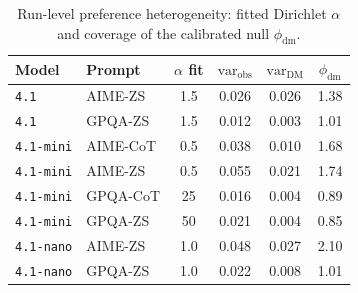 \documentclass[a4paper,fleqn]{cas-sc}
\begin{document}
\begin{table}[t]\begin{minipage}{\linewidth}
\centering
\caption{Run-level preference heterogeneity: fitted Dirichlet $\alpha$ and coverage of the calibrated null $\phi_{\mathrm{dm}}$.}
\label{tab:dispersion}
\begin{tabular}{llcccc}
\toprule
Model & Prompt & $\alpha$ fit & $\mathrm{var}_{\mathrm{obs}}$ &
$\mathrm{var}_{\mathrm{DM}}$ & $\phi_{\mathrm{dm}}$ \\
\midrule
\texttt{4.1} & AIME-ZS & 1.5 & 0.026 & 0.026 & 1.38 \\
\texttt{4.1} & GPQA-ZS & 1.5 & 0.012 & 0.003 & 1.01 \\
\texttt{4.1-mini} & AIME-CoT & 0.5 & 0.038 & 0.010 & 1.68 \\
\texttt{4.1-mini} & AIME-ZS & 0.5 & 0.055 & 0.021 & 1.74 \\
\texttt{4.1-mini} & GPQA-CoT & 25 & 0.016 & 0.004 & 0.89 \\
\texttt{4.1-mini} & GPQA-ZS & 50 & 0.021 & 0.004 & 0.85 \\
\texttt{4.1-nano} & AIME-ZS & 1.0 & 0.048 & 0.027 & 2.10 \\
\texttt{4.1-nano} & GPQA-ZS & 1.0 & 0.022 & 0.008 & 1.01 \\
\bottomrule
\end{tabular}
\end{minipage}\end{table}
\end{document}
